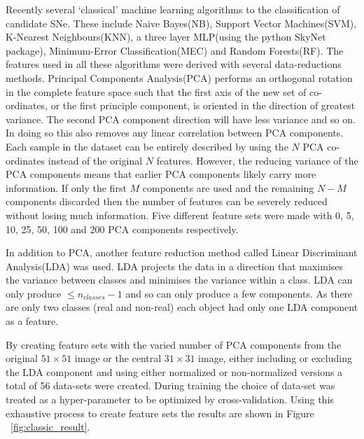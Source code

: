 Recently several `classical' machine learning algorithms to the classification of candidate SNe\citep{du2014machine}.
These include Naive Bayes(NB), Support Vector Machines(SVM), K-Nearest Neighbours(KNN), a three layer MLP(using the python SkyNet package), Minimum-Error Classification(MEC) and Random Forests(RF).
The features used in all these algorithms were derived with several data-reductions methods.
Principal Components Analysis(PCA)\citep{jolliffe2002principal} performs an orthogonal rotation in the complete feature space such that the first axis of the new set of co-ordinates, or the first principle component, is oriented in the direction of greatest variance.
The second PCA component direction will have less variance and so on.
In doing so this also removes any linear correlation between PCA components.
Each sample in the dataset can be entirely described by using the $N$ PCA co-ordinates instead of the original $N$ features.
However, the reducing variance of the PCA components means that earlier PCA components likely carry more information.
If only the first $M$ components are used and the remaining $N - M$ components discarded then the number of features can be severely reduced without losing much information.
Five different feature sets were made with 0, 5, 10, 25, 50, 100 and 200 PCA components respectively.

In addition to PCA, another feature reduction method called Linear Discriminant Analysis(LDA) was used. %
LDA projects the data in a direction that maximises the variance between classes and minimises the variance within a class.
LDA can only produce $\leq n_{classes} - 1$ and so can only produce a few components.
As there are only two classes (real and non-real) each object had only one LDA component as a feature.

By creating feature sets with the varied number of PCA components from the original $51\times 51$ image or the central $31\times 31$ image, either including or excluding the LDA component and using either normalized or non-normalized versions a total of 56 data-sets were created.
During training the choice of data-set was treated as a hyper-parameter to be optimized by cross-validation.
Using this exhaustive process to create feature sets the results are shown in Figure ~\ref{fig:classic_result}.

